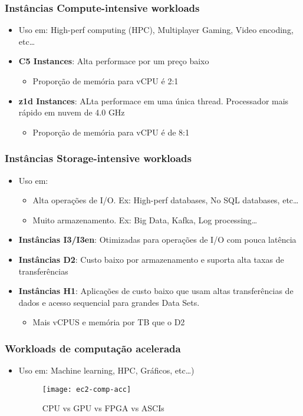 \begin{frame}
	\frametitle{Instâncias Compute-intensive workloads}
	\begin{itemize}
		\item Uso em: High-perf computing (HPC), Multiplayer Gaming, Video encoding, etc\dots
		\item \textbf{C5 Instances}: Alta performace por um preço baixo
			\begin{itemize}
				\item Proporção de memória para vCPU é 2:1
			\end{itemize}
		\item \textbf{z1d Instances}: ALta performace em uma única thread. Processador mais rápido em nuvem de 4.0 GHz
			\begin{itemize}
				\item Proporção de memória para vCPU é de 8:1
			\end{itemize}
	\end{itemize}
\end{frame}

\begin{frame}
	\frametitle{Instâncias Storage-intensive workloads}
	\begin{itemize}
		\item Uso em:
			\begin{itemize}
				\item Alta operações de I/O. Ex: High-perf databases, No SQL databases, etc\dots
				\item Muito armazenamento. Ex: Big Data, Kafka, Log processing\dots
			\end{itemize}
		\item \textbf{Instâncias I3/I3en}: Otimizadas para operações de I/O com pouca latência
		\item \textbf{Instâncias D2}: Custo baixo por armazenamento e suporta alta taxas de transferências
		\item \textbf{Instâncias H1}: Aplicações de custo baixo que usam altas transferências de dados e acesso sequencial para grandes Data Sets.
			\begin{itemize}
				\item Mais vCPUS e memória por TB que o D2
			\end{itemize}
	\end{itemize}
\end{frame}

\begin{frame}
	\frametitle{Workloads de computação acelerada}
	\begin{itemize}
		\item Uso em: Machine learning, HPC, Gráficos, etc\dots)
		\hfill
			\begin{figure}[htpb]
				\centering
				\texttt{[image: ec2-comp-acc]}
				\caption{CPU vs GPU vs FPGA vs ASCIs\cite{CDOLR}}
			\end{figure}
	\end{itemize}
\end{frame}

